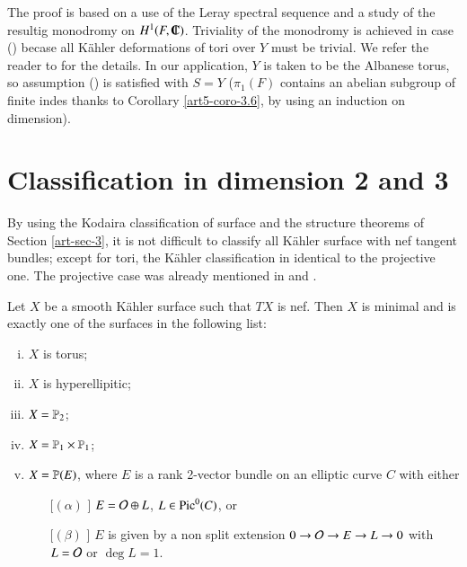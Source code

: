 The proof is based on a use of the Leray spectral sequence and a study of the resultig monodromy on $H^{1}(F, \IC)$. Triviality of the monodromy is achieved in case (\label{art5-enum-lemma(3.10)_{iii}}) becase all K\"ahler deformations of tori over $Y$ must be trivial. We refer the reader to \cite{art5-keyDPS91} for the details. In our application, $Y$ is taken to be the Albanese torus, so assumption (\label{art5-enum-lemma(3.10)_{iii}}) is satisfied with $S=Y$ ($\pi_{1}(F)$ contains an abelian subgroup of finite indes thanks to Corollary \ref{art5-coro-3.6}, by using an induction on dimension). 

\section{Classification in dimension 2 and 3}\label{art5-sec-4}

By using the Kodaira classification of surface and the structure theorems of Section \ref{art-sec-3}, it is not difficult to classify all K\"ahler surface with nef tangent bundles; except for tori, the K\"ahler classification in identical to the projective one. The projective case was already mentioned in \cite{art5-keyCP91} and \cite{art5-keyZh90}.
    \begin{theorem}
    Let $X$ be a smooth K\"ahler surface such that $TX$ is nef. Then $X$ is minimal and is exactly one of the surfaces in the following list:
    \begin{enumerate}[(i)]
    \item $X$ is torus;\label{art5-enum-thm-(1)}
    \item $X$ is hyperellipitic;\label{art5-enum-thm-(ii)}
    \item $X= \mathbb{P}_{2}$;\label{art5-enum-thm-(iii)}
    \item $X= \mathbb{P}_{1} \times \mathbb{P}_{1}$;\label{art5-enum-thm-(iv)}
    \item $X = \mathbb{P}(E)$, where $E$ is a rank 2-vector bundle on an elliptic curve $C$ with either \label{art5-enum-thm-(v)}
        \begin{enumerate}
        \item [[$(\alpha)$]] $E= \mathcal{O} \oplus L$, $L \in \operatorname{Pic}^{0}(C)$, or
        \item [[$(\beta)$]] $E$ is given by a non split extension $0 \rightarrow \mathcal{O} \rightarrow E \rightarrow L \rightarrow 0$ with $L = \mathcal{O}$ or $\deg L = 1$.
        \end{enumerate}
    \end{enumerate}
\end{theorem}


